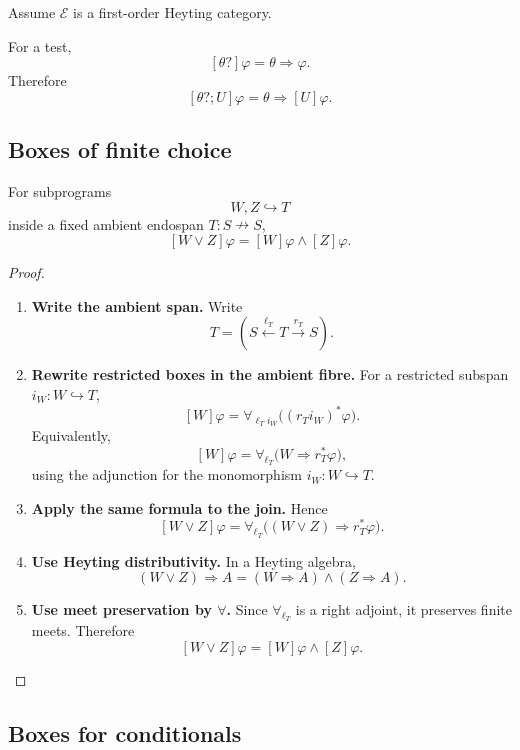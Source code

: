 Assume \(\mathcal E\) is a first-order Heyting category.

For a test,
\[
[\theta?]\varphi=\theta\Rightarrow\varphi.
\]
Therefore
\[
[\theta?;U]\varphi
=
\theta\Rightarrow[U]\varphi.
\]

\subsection{Boxes of finite choice}
\label{subsec:poly-relative-boxes-finite-choice}

\begin{proposition}
\label{prop:poly-relative-box-finite-choice}
For subprograms
\[
W,Z\hookrightarrow T
\]
inside a fixed ambient endospan \(T:S\nrightarrow S\),
\[
[W\vee Z]\varphi
=
[W]\varphi\wedge[Z]\varphi.
\]
\end{proposition}

\begin{proof}
\leavevmode
\begin{enumerate}
\item \textbf{Write the ambient span.}
Write
\[
T=(S\xleftarrow{\ell_T}T\xrightarrow{r_T}S).
\]

\item \textbf{Rewrite restricted boxes in the ambient fibre.}
For a restricted subspan \(i_W:W\hookrightarrow T\),
\[
[W]\varphi
=
\forall_{\ell_T i_W}\bigl((r_T i_W)^\ast\varphi\bigr).
\]
Equivalently,
\[
[W]\varphi
=
\forall_{\ell_T}\bigl(W\Rightarrow r_T^\ast\varphi\bigr),
\]
using the adjunction for the monomorphism \(i_W:W\hookrightarrow T\).

\item \textbf{Apply the same formula to the join.}
Hence
\[
[W\vee Z]\varphi
=
\forall_{\ell_T}
\bigl((W\vee Z)\Rightarrow r_T^\ast\varphi\bigr).
\]

\item \textbf{Use Heyting distributivity.}
In a Heyting algebra,
\[
(W\vee Z)\Rightarrow A
=
(W\Rightarrow A)\wedge(Z\Rightarrow A).
\]

\item \textbf{Use meet preservation by \(\forall\).}
Since \(\forall_{\ell_T}\) is a right adjoint, it preserves finite meets.
Therefore
\[
[W\vee Z]\varphi
=
[W]\varphi\wedge[Z]\varphi.
\]
\end{enumerate}
\end{proof}

\subsection{Boxes for conditionals}
\label{subsec:poly-relative-boxes-conditionals}

